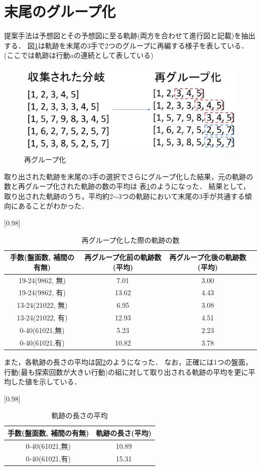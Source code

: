 \section{末尾のグループ化}
提案手法は予想図とその予想図に至る軌跡(両方を合わせて進行図と記載)を抽出する．
図\ref{fig:regroup}は軌跡を末尾の3手で2つのグループに再編する様子を表している．(ここでは軌跡は行動$a$の連続として表している)
\begin{figure}[htbp]
	\centering
	\includegraphics[width=\linewidth]{./figure/regroup.pdf}
	\caption{再グループ化}
	\label{fig:regroup}
\end{figure}
取り出された軌跡を末尾の3手の選択でさらにグループ化した結果，元の軌跡の数と再グループ化された軌跡の数の平均は
表\ref{table:tail}のようになった．
結果として，取り出された軌跡のうち，平均約2$\sim$3つの軌跡において末尾の3手が共通する傾向にあることがわかった．
\begin{table}[H]
	\caption{再グループ化した際の軌跡の数}
    \scriptsize
    \label{table:tail}
	\centering
	\scalebox{0.98}[0.98]{
		\begin{tabular}{c|c|c||c}
			手数(盤面数, 補間の有無)&  再グループ化前の軌跡数(平均)&  再グループ化後の軌跡数(平均)\\ \hline
			19-24(9862, 無)    & 7.01 & 3.00  \\
			19-24(9862, 有)    & 13.62 & 4.43  \\
			13-24(21022, 無)   &  6.95& 3.08  \\
			13-24(21022, 有)   & 12.93 & 4.51 \\
		    0-40(61021,無)& 5.23 & 2.23\\
		    0-40(61021,有)& 10.82 & 3.78\\
		\end{tabular}
	}

	
\end{table}
また，各軌跡の長さの平均は図\ref{fig:length}のようになった．
なお，正確には1つの盤面，行動(最も探索回数が大きい行動)の組に対して取り出される軌跡の平均を更に平均した値を示している．
\begin{table}[H]
	\caption{軌跡の長さの平均}
    \scriptsize
    \label{fig:length}
	\centering
	\scalebox{0.98}[0.98]{
		\begin{tabular}{c|c}
			手数(盤面数, 補間の有無)&  軌跡の長さ(平均)\\ \hline
		    0-40(61021,無)& 10.89\\
		    0-40(61021,有)& 15.31\\
		\end{tabular}
	}	
\end{table}

